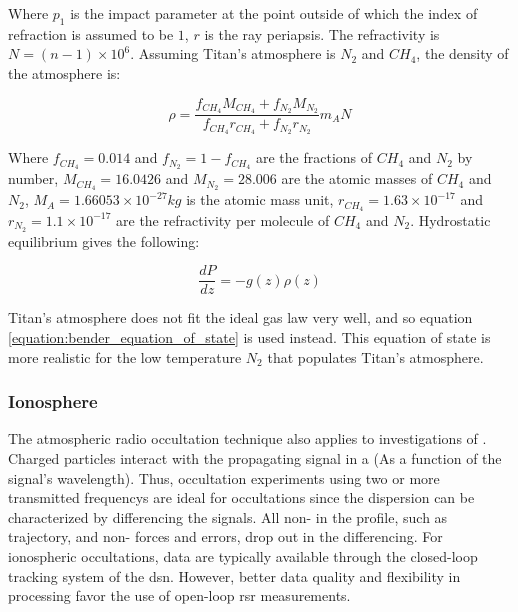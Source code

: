 \documentclass{article}
\theoremstyle{mystyle}
\begin{document}
\noindent Where $p_1$ is the impact parameter at the point outside of which the index of refraction is assumed to be $1$, $r$ is the \gls{ray periapsis}. The refractivity is $N=(n-1)\times 10^6$. Assuming Titan's atmosphere is $N_2$ and $CH_4$, the density of the atmosphere is:

\begin{equation}
\rho = \frac{f_{CH_4}M_{CH_4}+f_{N_2}M_{N_2}}{f_{CH_4}r_{CH_4}+f_{N_2}r_{N_2}}m_{A}N
\end{equation}

\noindent Where $f_{CH_4} = 0.014$ and $f_{N_2} = 1-f_{CH_4}$ are the fractions of $CH_{4}$ and $N_{2}$ by number, $M_{CH_4} = 16.0426$ and $M_{N_2} = 28.006$ are the atomic masses of $CH_{4}$ and $N_2$, $M_{A} = 1.66053\times 10^{-27}kg$ is the atomic mass unit, $r_{CH_4} = 1.63\times 10^{-17}$ and $r_{N_2} = 1.1\times 10^{-17}$ are the refractivity per molecule of $CH_{4}$ and $N_2$. Hydrostatic equilibrium gives the following:

\begin{equation}
\label{equation:bender_equation_of_state}
\frac{dP}{dz} = -g(z)\rho(z)
\end{equation}

\noindent Titan's atmosphere does not fit the ideal gas law very well, and so equation \ref{equation:bender_equation_of_state} is used instead. This equation of state is more realistic for the low temperature $N_2$ that populates Titan's atmosphere. 

\subsubsection{\footnotesize Ionosphere}

The atmospheric radio \gls{occultation} technique also applies to investigations of . Charged particles interact with the propagating signal in a  (As a function of the signal’s wavelength). Thus, \gls{occultation} experiments using two or more transmitted \glspl{frequency} are ideal for  \glspl{occultation} since the \gls{dispersion} can be characterized by differencing the signals. All non- in the  profile, such as \gls{trajectory},  and non- forces and errors, drop out in the differencing. For ionospheric \glspl{occultation},  data are typically available through the \gls{closed-loop} tracking system of the \gls{dsn}. However, better data quality and flexibility in processing favor the use of \gls{open-loop} \gls{rsr} measurements.
\end{document}
